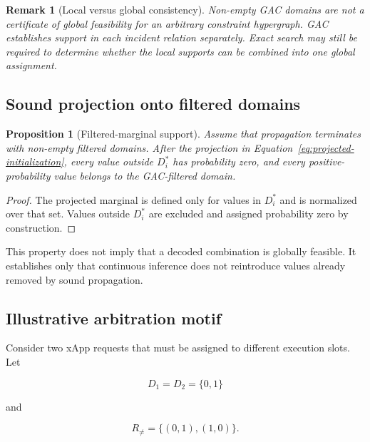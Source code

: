 \documentclass[pdflatex,sn-mathphys-num,iicol,oneside]{sn-jnl}
\newtheorem{proposition}{Proposition}
\newtheorem{remark}{Remark}
\begin{document}
\begin{remark}[Local versus global consistency]
Non-empty GAC domains are not a certificate of global feasibility for
an arbitrary constraint hypergraph. GAC establishes support in each
incident relation separately. Exact search may still be required to
determine whether the local supports can be combined into one global
assignment.
\end{remark}

\subsection{Sound projection onto filtered domains}

\begin{proposition}[Filtered-marginal support]
Assume that propagation terminates with non-empty filtered domains.
After the projection in
Equation~\eqref{eq:projected-initialization}, every value outside
$D_i^{*}$ has probability zero, and every positive-probability value
belongs to the GAC-filtered domain.
\end{proposition}

\begin{proof}
The projected marginal is defined only for values in $D_i^{*}$ and is
normalized over that set. Values outside $D_i^{*}$ are excluded and
assigned probability zero by construction.
\end{proof}

This property does not imply that a decoded combination is globally
feasible. It establishes only that continuous inference does not
reintroduce values already removed by sound propagation.

\subsection{Illustrative arbitration motif}

Consider two xApp requests that must be assigned to different
execution slots. Let

\begin{equation}
D_1=D_2=\{0,1\}
\end{equation}

and

\begin{equation}
R_{\neq}
=
\{(0,1),(1,0)\}.
\end{equation}
\end{document}
